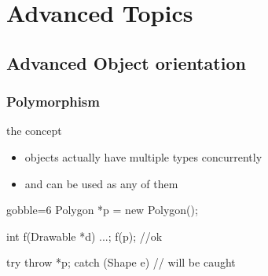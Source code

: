 \section{Advanced Topics}

\iffalse
\subsection[Advanced OO]{Advanced Object orientation}


\begin{frame}[fragile]
  \frametitle{Polymorphism}
  \begin{block}{the concept}
    \begin{itemize}
    \item objects actually have multiple types concurrently
    \item and can be used as any of them
    \end{itemize}
  \end{block}
  \begin{multicols}{2}
    \begin{cppcode*}{gobble=6}
      Polygon *p = new Polygon();

      int f(Drawable *d) {...};
      f(p);  //ok

      try {
        throw *p;
      } catch (Shape e) {
        // will be caught
      }
    \end{cppcode*}
    \columnbreak
    \center
  \end{multicols}
\end{frame}

